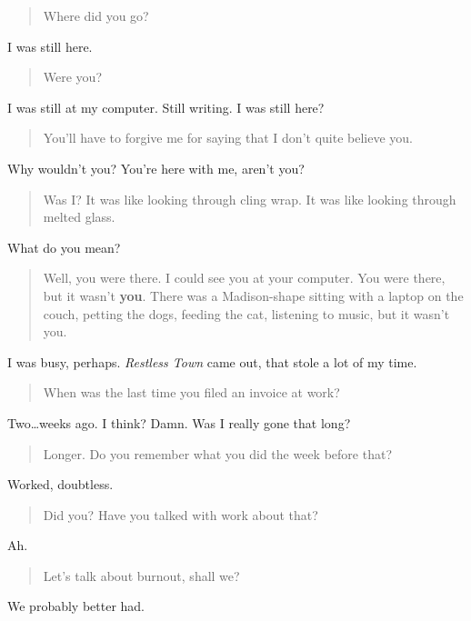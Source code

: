 \label{ally:29}
\begin{paracol}{2}
  \begin{leftcolumn}

\begin{quote}
Where did you go?
\end{quote}
I was still here.

\begin{quote}
Were you?
\end{quote}
I was still at my computer. Still writing. I was still here?

\begin{quote}
You'll have to forgive me for saying that I don't quite believe you.
\end{quote}
Why wouldn't you? You're here with me, aren't you?

\begin{quote}
Was I? It was like looking through cling wrap. It was like looking through melted glass.
\end{quote}
What do you mean?

\begin{quote}
Well, you were there. I could see you at your computer. You were there, but it wasn't \textbf{you}. There was a Madison-shape sitting with a laptop on the couch, petting the dogs, feeding the cat, listening to music, but it wasn't you.
\end{quote}
I was busy, perhaps. \emph{Restless Town} came out, that stole a lot of my time.

\begin{quote}
When was the last time you filed an invoice at work?
\end{quote}
Two\ldots{}weeks ago. I think? Damn. Was I really gone that long?

\begin{quote}
Longer. Do you remember what you did the week before that?
\end{quote}
Worked, doubtless.

\begin{quote}
Did you? Have you talked with work about that?
\end{quote}
Ah.

\begin{quote}
Let's talk about burnout, shall we?
\end{quote}
We probably better had.
\newpage
\end{leftcolumn}
\end{paracol}
